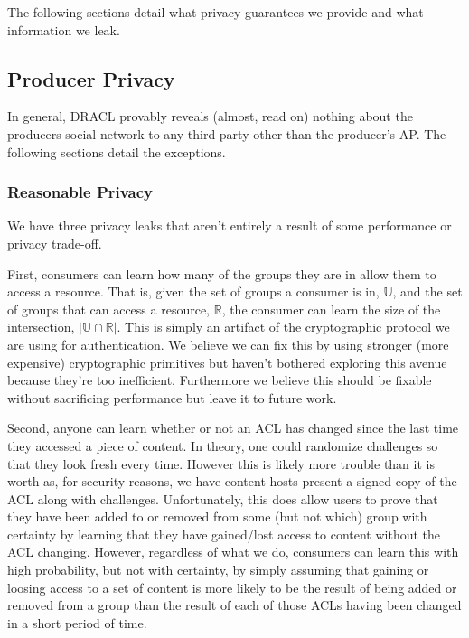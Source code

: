 \documentclass[pdftex,12pt,a4papaer,twoside,notitlepage]{report}
\begin{document}
The following sections detail what privacy guarantees we provide and what
information we leak.

\subsection{Producer Privacy}
\label{sec:producer_privacy}

In general, DRACL provably reveals (almost, read on) nothing about the producers
social network to any third party other than the producer's AP. The following
sections detail the exceptions.

\subsubsection{Reasonable Privacy}
\label{sec:resonable_privacy}

We have three privacy leaks that aren't entirely a result of some performance or
privacy trade-off.

First, consumers can learn how many of the groups they are in allow them to
access a resource. That is, given the set of groups a consumer is in,
$\mathbb{U}$, and the set of groups that can access a resource, $\mathbb{R}$,
the consumer can learn the size of the intersection, $|\mathbb{U} \cap
\mathbb{R}|$. This is simply an artifact of the cryptographic protocol we are
using for authentication. We believe we can fix this by using stronger (more
expensive) cryptographic primitives but haven't bothered exploring this avenue
because they're too inefficient. Furthermore we believe this should be fixable
without sacrificing performance but leave it to future work.

Second, anyone can learn whether or not an ACL has changed since the last time
they accessed a piece of content. In theory, one could randomize challenges so
that they look fresh every time. However this is likely more trouble than it is
worth as, for security reasons, we have content hosts present a signed copy of
the ACL along with challenges. Unfortunately, this does allow users to prove
that they have been added to or removed from some (but not which) group with
certainty by learning that they have gained/lost access to content without the
ACL changing. However, regardless of what we do, consumers can learn this with
high probability, but not with certainty, by simply assuming that gaining or
loosing access to a set of content is more likely to be the result of being
added or removed from a group than the result of each of those ACLs having been
changed in a short period of time.
\end{document}
